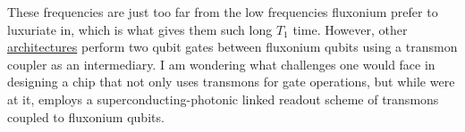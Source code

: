 \documentclass[
 reprint,
 superscriptaddress,
 bibnotes,
 amsmath,
 amssymb,
 aps,
 prb,
 citeautoscript,
 floatfix,
]{revtex4-2}
\begin{document}
    These frequencies are just too far from the low frequencies fluxonium prefer to luxuriate in, which is what gives them such long $T_1$ time. However, other \href{https://arxiv.org/abs/2304.06087}{architectures} perform two qubit gates between fluxonium qubits using a transmon coupler as an intermediary. I am wondering what challenges one would face in designing a chip that not only uses transmons for gate operations, but while were at it, employs a superconducting-photonic linked readout scheme of transmons coupled to fluxonium qubits. 
\end{document}
